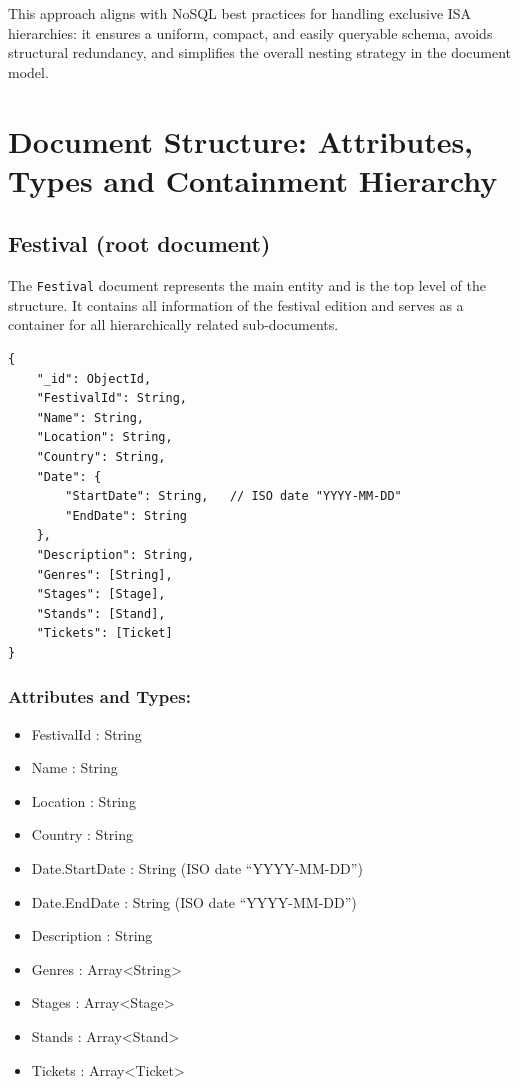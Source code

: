\documentclass[11pt,a4paper]{report}
\begin{document}
This approach aligns with NoSQL best practices for handling exclusive ISA hierarchies: it ensures a uniform, compact, and easily queryable schema, avoids structural redundancy, and simplifies the overall nesting strategy in the document model.

\section{Document Structure: Attributes, Types and Containment Hierarchy}
\subsection{Festival (root document)}

The \texttt{Festival} document represents the main entity and is the top level of the structure. It contains all information of the festival edition and serves as a container for all hierarchically related sub-documents.




\begin{lstlisting}
{
    "_id": ObjectId,
    "FestivalId": String,
    "Name": String,
    "Location": String,
    "Country": String,
    "Date": {
        "StartDate": String,   // ISO date "YYYY-MM-DD"
        "EndDate": String
    },
    "Description": String,
    "Genres": [String],
    "Stages": [Stage],
    "Stands": [Stand],
    "Tickets": [Ticket]
}
\end{lstlisting}

\subsubsection{Attributes and Types:}

\begin{itemize}
    \item FestivalId : String
    \item Name : String
    \item Location : String
    \item Country : String
    \item Date.StartDate : String (ISO date “YYYY-MM-DD”)
    \item Date.EndDate : String (ISO date “YYYY-MM-DD”)
    \item Description : String
    \item Genres : Array<String>
    \item Stages : Array<Stage>
    \item Stands : Array<Stand>
    \item Tickets : Array<Ticket>
    
\end{itemize}
\end{document}
